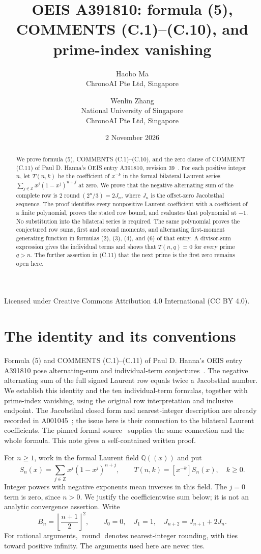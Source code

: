 \documentclass[11pt]{article}
\title{OEIS A391810: formula (5),\\
COMMENTS (C.1)--(C.10), and prime-index vanishing}
\author{Haobo Ma\\
\small ChronoAI Pte Ltd, Singapore
\and Wenlin Zhang\\
\small National University of Singapore\\
\small ChronoAI Pte Ltd, Singapore}
\date{2 November 2026}
\newcommand{\Z}{\mathbb Z}
\newcommand{\Q}{\mathbb Q}
\newcommand{\round}{\operatorname{round}}
\begin{document}
\maketitle
\begin{center}\small
Licensed under Creative Commons Attribution 4.0 International (CC BY 4.0).
\end{center}
\begin{abstract}
We prove formula (5), COMMENTS (C.1)--(C.10), and the zero clause of
COMMENT (C.11) of Paul D. Hanna's OEIS entry A391810,
revision 39~\cite{hanna}.
For each positive integer $n$, let $T(n,k)$ be the coefficient of $x^{-k}$
in the formal bilateral Laurent series
$\sum_{j\in\Z}x^j(1-x^j)^{n+j}$ at zero.
We prove that the negative alternating sum of the complete row is
$2\round(2^n/3)=2J_n$, where $J_n$ is the offset-zero Jacobsthal sequence.
The proof identifies every nonpositive Laurent coefficient with a coefficient
of a finite polynomial, proves the stated row bound, and evaluates that
polynomial at $-1$. No substitution into the bilateral series is required.
The same polynomial proves the conjectured row sums, first and second
moments, and alternating first-moment generating function in formulas
(2), (3), (4), and (6) of that entry. A divisor-sum expression gives
the individual terms and shows that $T(n,q)=0$ for every prime $q>n$.
The further assertion in (C.11) that the next prime is the first zero
remains open here.
\end{abstract}

\section{The identity and its conventions}

Formula (5) and COMMENTS (C.1)--(C.11) of Paul D. Hanna's OEIS entry A391810
pose alternating-sum and individual-term conjectures~\cite{hanna}.
The negative
alternating sum of the full signed Laurent row equals twice a Jacobsthal
number. We establish this identity and the ten individual-term formulas,
together with prime-index vanishing, using the original row
interpretation and inclusive endpoint. The Jacobsthal closed form and
nearest-integer description are already recorded in A001045~\cite{jacobsthal};
the issue here is their connection to the bilateral Laurent coefficients.
The pinned formal source~\cite{formal} supplies the same connection and
the whole formula. This note gives a self-contained written proof.

For $n\geq1$, work in the formal Laurent field $\Q((x))$ and put
\begin{equation}\label{eq:series}
 S_n(x)=\sum_{j\in\Z}x^j(1-x^j)^{n+j},\qquad
 T(n,k)=[x^{-k}]S_n(x),\quad k\geq0.
\end{equation}
Integer powers with negative exponents mean inverses in this field.
The $j=0$ term is zero, since $n>0$.
We justify the coefficientwise sum below; it is not an analytic convergence
assertion. Write
\[
 B_n=\left\lfloor\frac{n+1}{2}\right\rfloor^2,
 \qquad J_0=0,\quad J_1=1,\quad J_{n+2}=J_{n+1}+2J_n.
\]
For rational arguments, $\round$ denotes nearest-integer rounding, with ties
toward positive infinity. The arguments used here are never ties.
\end{document}

